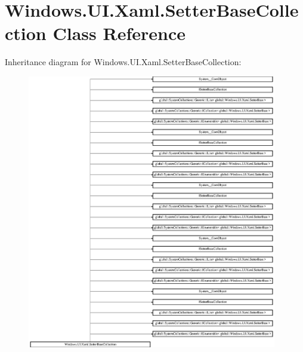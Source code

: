 \hypertarget{class_windows_1_1_u_i_1_1_xaml_1_1_setter_base_collection}{}\section{Windows.\+U\+I.\+Xaml.\+Setter\+Base\+Collection Class Reference}
\label{class_windows_1_1_u_i_1_1_xaml_1_1_setter_base_collection}
Inheritance diagram for Windows.\+U\+I.\+Xaml.\+Setter\+Base\+Collection\+:\begin{figure}[H]
\begin{center}
\leavevmode
\includegraphics[height=12.000000cm]{class_windows_1_1_u_i_1_1_xaml_1_1_setter_base_collection}
\end{center}
\end{figure}
